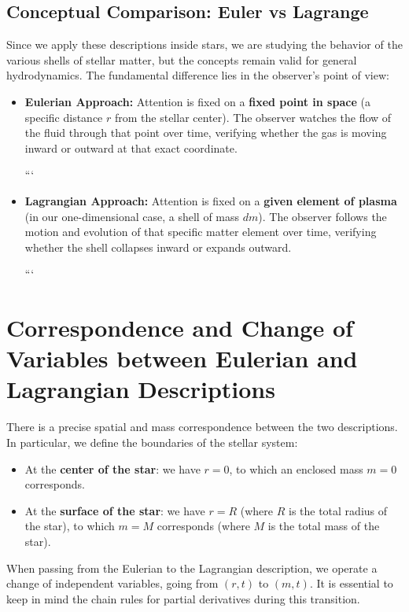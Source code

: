 \subsection{Conceptual Comparison: Euler vs Lagrange}

Since we apply these descriptions inside stars, we are studying the behavior of the various shells of stellar matter, but the concepts remain valid for general hydrodynamics. The fundamental difference lies in the observer's point of view:

\begin{itemize}
\item \textbf{Eulerian Approach:} Attention is fixed on a \textbf{fixed point in space} (a specific distance $r$ from the stellar center). The observer watches the flow of the fluid through that point over time, verifying whether the gas is moving inward or outward at that exact coordinate.

```
\item \textbf{Lagrangian Approach:} Attention is fixed on a \textbf{given element of plasma} (in our one-dimensional case, a shell of mass $dm$). The observer follows the motion and evolution of that specific matter element over time, verifying whether the shell collapses inward or expands outward.


```

\end{itemize}

\section{Correspondence and Change of Variables between Eulerian and Lagrangian Descriptions}

There is a precise spatial and mass correspondence between the two descriptions. In particular, we define the boundaries of the stellar system:
\begin{itemize}
\item At the \textbf{center of the star}: we have $r = 0$, to which an enclosed mass $m = 0$ corresponds.
\item At the \textbf{surface of the star}: we have $r = R$ (where $R$ is the total radius of the star), to which $m = M$ corresponds (where $M$ is the total mass of the star).
\end{itemize}

When passing from the Eulerian to the Lagrangian description, we operate a change of independent variables, going from $(r, t)$ to $(m, t)$. It is essential to keep in mind the chain rules for partial derivatives during this transition.

